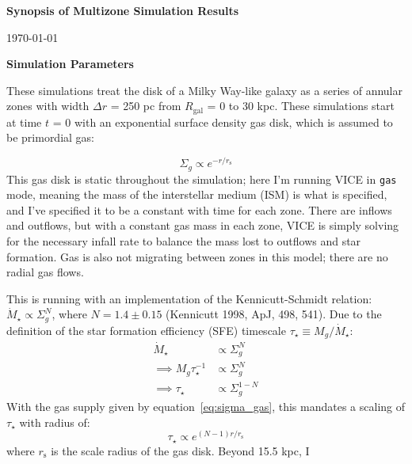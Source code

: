 \documentclass[12pt]{report}
\begin{document}
 
\noindent 
\textbf{Synopsis of Multizone Simulation Results} 
\par\noindent 
\today 
\par\null\par

\begin{center} 
\hypertarget{sec:params}{\textbf{Simulation Parameters}} 
\end{center} 
\par\noindent 
These simulations treat the disk of a Milky Way-like galaxy as a series of 
annular zones with width $\Delta r$ = 250 pc from $R_\text{gal}$ = 0 to 30 kpc. 
These simulations start at time $t$ = 0 with an exponential surface density 
gas disk, which is assumed to be primordial gas: 

\begin{equation} 
\label{eq:sigma_gas} 
\Sigma_g \propto e^{-r/r_\text{s}} 
\end{equation} 
This gas disk is static throughout the simulation; here I'm running VICE in 
\texttt{gas} mode, meaning the mass of the interstellar medium (ISM) is what 
is specified, and I've specified it to be a constant with time for each zone. 
There are inflows and outflows, but with a constant gas mass in each zone, 
VICE is simply solving for the necessary infall rate to balance the mass lost 
to outflows and star formation. Gas is also not migrating between zones in 
this model; there are no radial gas flows. 
\par 
This is running with an implementation of the Kennicutt-Schmidt relation: 
$\dot{M}_\star \propto \Sigma_g^N$, where $N = 1.4 \pm 0.15$ (Kennicutt 1998, 
ApJ, 498, 541). Due to the definition of the star formation efficiency (SFE) 
timescale $\tau_\star \equiv M_g/\dot{M}_\star$: 
\begin{equation}\begin{aligned} 
\dot{M}_\star &\propto \Sigma_g^N \\ 
\implies M_g\tau_\star^{-1} &\propto \Sigma_g^N \\ 
\implies \tau_\star &\propto \Sigma_g^{1 - N} 
\end{aligned}\end{equation} 
With the gas supply given by equation~\ref{eq:sigma_gas}, this mandates a 
scaling of $\tau_\star$ with radius of: 
\begin{equation}
\tau_\star \propto e^{(N - 1)r/r_\text{s}} 
\end{equation}
where $r_\text{s}$ is the scale radius of the gas disk. Beyond 15.5 kpc, I 
\end{document}
